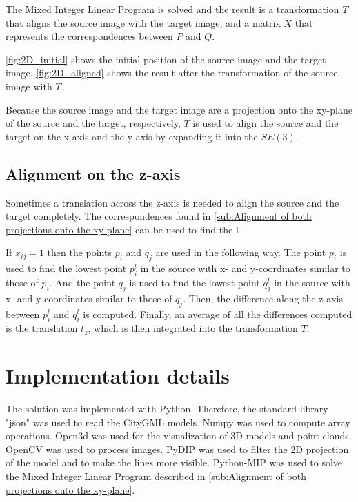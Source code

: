             The Mixed Integer Linear Program is solved and the result is a transformation $T$ that aligns the source image with the target image,
            and a matrix $X$ that represents the correspondences between $P$ and $Q$.

            \autoref{fig:2D_initial} shows the initial position of the source image and the target image.
            \autoref{fig:2D_aligned} shows the result after the transformation of the source image with $T$.

            Because the source image and the target image are a projection onto the xy-plane of the source and the target, respectively,
            $T$ is used to align the source and the target on the x-axis and the y-axis by expanding it into the $SE(3)$.

        \subsection{Alignment on the z-axis}
            Sometimes a translation across the z-axis is needed to align the source and the target completely.
            The correspondences found in \autoref{sub:Alignment of both projections onto the xy-plane} 
            can be used to find the l

            If $x_{ij} = 1$ then the points $p_i$ and $q_j$ are used in the following way.
            The point $p_i$ is used to find the lowest point $p_i^l$ in the source with x- and y-coordinates similar to those of $p_i$.
            And the point $q_j$ is used to find the lowest point $q_j^l$ in the source with x- and y-coordinates similar to those of $q_j$.
            Then, the difference along the z-axis between $p_i^l$ and $q_i^l$ is computed.
            Finally, an average of all the differences computed is the translation $t_z$, which is then integrated into the transformation $T$.

    \section{Implementation details}
        The solution was implemented with Python. Therefore, the standard library "json" was used to read the CityGML models.
        Numpy \cite{harris_2020_numpy} was used to compute array operations.
        Open3d \cite{Zhou_2018_open3d} was used for the visualization of 3D models and point clouds.
        OpenCV \cite{opencv_library} was used to process images.
        PyDIP \cite{DIPlib_library} was used to filter the 2D projection of the model and to make the lines more visible. 
        Python-MIP \cite{pythonMIP_library} was used to solve the Mixed Integer Linear Program described in \autoref{sub:Alignment of both projections onto the xy-plane}.

